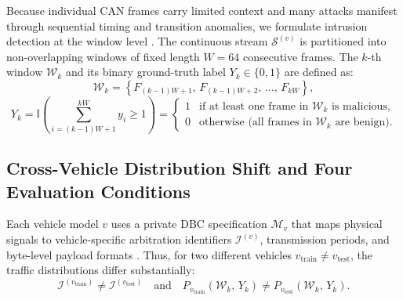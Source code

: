 \documentclass[12pt, a4paper, reqno, oneside]{book}
\begin{document}
Because individual CAN frames carry limited context and many attacks manifest through sequential timing and transition anomalies, we formulate intrusion detection at the window level \cite{song2020invehicle, islam2020graph}. The continuous stream $\mathcal{S}^{(v)}$ is partitioned into non-overlapping windows of fixed length $W = 64$ consecutive frames. The $k$-th window $\mathcal{W}_k$ and its binary ground-truth label $Y_k \in \{0, 1\}$ are defined as:
\begin{equation}
    \mathcal{W}_k = \left\{ F_{(k-1)W + 1},\, F_{(k-1)W + 2},\, \dots,\, F_{kW} \right\},
\end{equation}
\begin{equation}
    Y_k = \mathbb{I}\!\left( \sum_{i=(k-1)W+1}^{kW} y_i \ge 1 \right) = 
    \begin{cases} 
        1 & \text{if at least one frame in } \mathcal{W}_k \text{ is malicious}, \\
        0 & \text{otherwise (all frames in } \mathcal{W}_k \text{ are benign)}.
    \end{cases}
\end{equation}

\subsection{Cross-Vehicle Distribution Shift and Four Evaluation Conditions}
Each vehicle model $v$ uses a private DBC specification $\mathcal{M}_v$ that maps physical signals to vehicle-specific arbitration identifiers $\mathcal{I}^{(v)}$, transmission periods, and byte-level payload formats \cite{lampe2023cantrain, lampe2024curated}. Thus, for two different vehicles $v_{\text{train}} \neq v_{\text{test}}$, the traffic distributions differ substantially:
\begin{equation}
    \mathcal{I}^{(v_{\text{train}})} \neq \mathcal{I}^{(v_{\text{test}})} \quad \text{and} \quad P_{v_{\text{train}}}\!\left(\mathcal{W}_k,\, Y_k\right) \neq P_{v_{\text{test}}}\!\left(\mathcal{W}_k,\, Y_k\right).
\end{equation}
\end{document}
